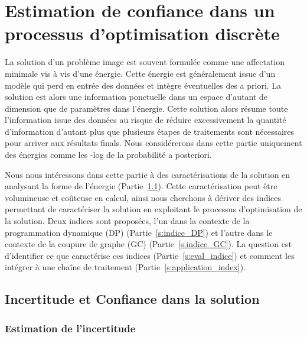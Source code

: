 \documentclass[../main/These_Mathias_Paget.tex]{subfiles}
\begin{document}

\chapter{Estimation de confiance dans un processus d'optimisation discrète}

	La solution d'un problème image est souvent formulée comme une affectation minimale vis à vis d'une énergie. Cette énergie est généralement issue d'un modèle qui perd en entrée des données et intègre éventuelles des a priori. La solution est alors une information ponctuelle dans un espace d'autant de dimension que de paramètres dans l’énergie. Cette solution alors résume toute l'information issue des données au risque de réduire excessivement la quantité d'information d'autant plus que plusieurs étapes de traitements sont nécessaires pour arriver aux résultats finals. Nous considérerons dans cette partie uniquement des énergies comme les -log de la probabilité a posteriori.
	
	Nous nous intéressons dans cette partie à des caractérisations de la solution en analysant la forme de l’énergie (Partie~\ref{s:incert_conf}). Cette caractérisation peut être volumineuse et coûteuse en calcul, ainsi nous cherchons à dériver des indices permettant de caractériser la solution en exploitant le processus d'optimisation de la solution. Deux indices sont proposées, l'un dans la contexte de la programmation dynamique (DP) (Partie~\ref{s:indice_DP}) et l'autre dans le contexte de la coupure de graphe (GC) (Partie~\ref{s:indice_GC}). La question est d'identifier ce que caractérise ces indices (Partie~\ref{s:eval_indice}) et comment les intégrer à une chaîne de traitement (Partie~\ref{s:application_index}).
	

\section{Incertitude et Confiance dans la solution}
\label{s:incert_conf}

\subsection{Estimation de l'incertitude}
\end{document}
